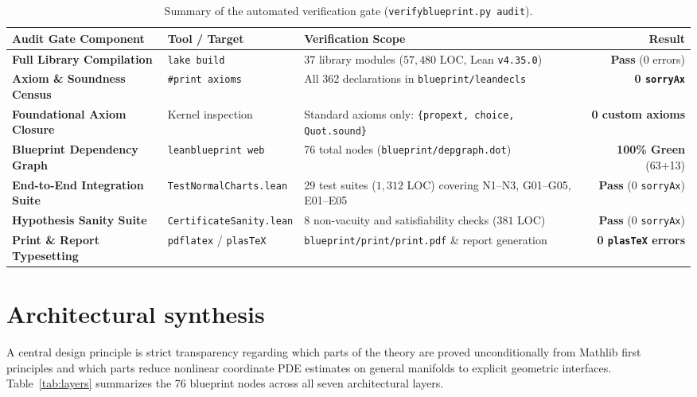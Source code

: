 \documentclass[10pt]{article}
\renewcommand{\_}{\origus\allowbreak}
\newcommand{\code}[1]{\texttt{#1}}
\begin{document}
\begin{table}[!ht]
\centering\footnotesize
\renewcommand{\arraystretch}{1.12}
\begin{tabularx}{\textwidth}{@{}>{\bfseries}l l X r@{}}
\toprule
Audit Gate Component & Tool / Target & Verification Scope & Result \\
\midrule
Full Library Compilation & \code{lake build} & 37 library modules ($57{,}480$ LOC, Lean \code{v4.35.0}) & \textbf{Pass} (0 errors) \\
Axiom \& Soundness Census & \code{\#print axioms} & All 362 declarations in \code{blueprint/lean\_decls} & \textbf{0 \code{sorryAx}} \\
Foundational Axiom Closure & Kernel inspection & Standard axioms only: \code{\{propext, choice, Quot.sound\}} & \textbf{0 custom axioms} \\
Blueprint Dependency Graph & \code{leanblueprint web} & 76 total nodes (\code{blueprint/dep\_graph.dot}) & \textbf{100\% Green} (63+13) \\
End-to-End Integration Suite & \code{TestNormalCharts.lean} & 29 test suites ($1{,}312$ LOC) covering N1--N3, G01--G05, E01--E05 & \textbf{Pass} (0 \code{sorryAx}) \\
Hypothesis Sanity Suite & \code{CertificateSanity.lean} & 8 non-vacuity and satisfiability checks ($381$ LOC) & \textbf{Pass} (0 \code{sorryAx}) \\
Print \& Report Typesetting & \code{pdflatex} / \code{plasTeX} & \code{blueprint/print/print.pdf} \& report generation & \textbf{0 \code{plasTeX} errors} \\
\bottomrule
\end{tabularx}
\caption{Summary of the automated verification gate (\code{verify\_blueprint.py audit}).}
\label{tab:audit}
\end{table}


\section{Architectural synthesis}

A central design principle is strict transparency regarding which parts of
the theory are proved unconditionally from Mathlib first principles and which parts reduce nonlinear
coordinate PDE estimates on general manifolds to explicit geometric interfaces. Table~\ref{tab:layers}
summarizes the 76 blueprint nodes across all seven architectural layers.
\end{document}
